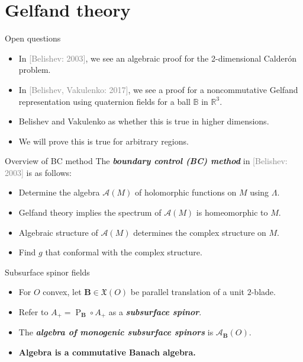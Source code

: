 \documentclass[aspectratio=169]{beamer}
\newcommand\boldgreen[1]{\textcolor{lighter_csu_green}{\emph{\textbf{#1}}}}
\newcommand\boldgold[1]{\textcolor{csu_gold}{\textbf{#1}}}
\newcommand\grey[1]{\textcolor{gray}{#1}}
\newcommand{\R}{\mathbb{R}}
\newcommand{\algebra}{\mathcal{A}}
\newcommand{\ball}{\mathbb{B}}
\newcommand{\projection}{\operatorname{P}}
\newcommand{\blade}[1]{\boldsymbol{#1}}
\newcommand{\bivector}{\blade{B}}
\newcommand{\smoothfields}{\mathfrak{X}}
\begin{document}
\section{Gelfand theory}

\begin{frame}{Open questions}
\vfill
\begin{itemize}
\pause
    \item In \grey{[Belishev: 2003]}, we see an algebraic proof for the 2-dimensional Calder\'on problem.
\pause
    \item In \grey{[Belishev, Vakulenko: 2017]}, we see a proof for a noncommutative Gelfand representation using quaternion fields for a ball $\ball$ in $\R^3$.
\pause
    \item Belishev and Vakulenko as whether this is true in higher dimensions.
\pause
    \item We will prove this is true for arbitrary regions.
\end{itemize}
\vfill
\end{frame}

\begin{frame}{Overview of BC method}
\vfill
The \boldgreen{boundary control (BC) method} in \grey{[Belishev: 2003]} is as follows:
\begin{itemize}
    \pause
    \item Determine the algebra $\algebra{}(M)$ of holomorphic functions on $M$ using $\Lambda$.
    \pause
    \item Gelfand theory implies the spectrum of $\algebra{}(M)$ is homeomorphic to $M$.
    \pause
    \item Algebraic structure of $\algebra{}(M)$ determines the complex structure on $M$.
    \pause
    \item Find $g$ that conformal with the complex structure.
\end{itemize}
\vfill
\end{frame}

\begin{frame}{Subsurface spinor fields}
\vfill
\begin{itemize}
\pause
\item For $O$ convex, let $\bivector \in \smoothfields(O)$ be parallel translation of a unit $2$-blade.
\pause
\item Refer to $A_+ = \projection_{\bivector} \circ A_+$ as a \boldgreen{subsurface spinor}.
\end{itemize}
\begin{figure}[H]
    \centering
    \def\svgwidth{0.3\columnwidth}
\resizebox{.25\textwidth}{!}{}
\end{figure}
\pause
\begin{itemize}
\item The \boldgreen{algebra of monogenic subsurface spinors} is $\algebra_{\bivector}(O)$.
\pause
\item \boldgold{Algebra is a commutative Banach algebra.}
\end{itemize}
\vfill
\end{frame}
\end{document}
